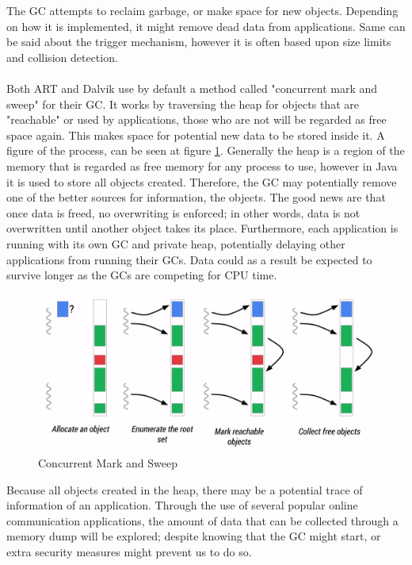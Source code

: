 The GC attempts to reclaim garbage, or make space for new objects. Depending on how it is implemented, it might remove dead data from applications. Same can be said about the trigger mechanism, however it is often based upon size limits and collision detection.\\
\\
Both ART and Dalvik use by default a method called "concurrent mark and sweep" for their GC\cite{ARTGC,DALVIKGC}. It works by traversing the heap for objects that are "reachable" or used by applications, those who are not will be regarded as free space again. This makes space for potential new data to be stored inside it. A figure of the process, can be seen at figure \ref{fig:mas}. Generally the heap is a region of the memory that is regarded as free memory for any process to use, however in Java it is used to store all objects created. Therefore, the GC may potentially remove one of the better sources for information, the objects. The good news are that once data is freed, no overwriting is enforced; in other words, data is not overwritten until another object takes its place\cite{DALVIKGC}. Furthermore, each application is running with its own GC and private heap, potentially delaying other applications from running their GCs\cite{AndroidMemManagement}. Data could as a result be expected to survive longer as the GCs are competing for CPU time.

\begin{figure}[h]
  \includegraphics[width=0.5 \textwidth]{figures/gc}
  \caption{Concurrent Mark and Sweep\cite{ARTGC}}
  \label{fig:mas}
\end{figure}

Because all objects created in the heap, there may be a potential trace of information of an application. Through the use of several popular online communication applications, the amount of data that can be collected through a memory dump will be explored; despite knowing that the GC might start, or extra security measures might prevent us to do so.

